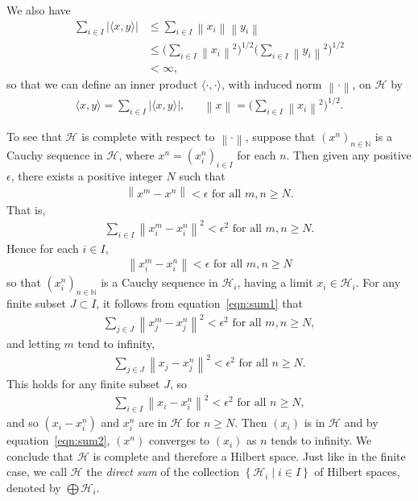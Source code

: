\documentclass[11pt,a4paper]{report}
\theoremstyle{plain}
\theoremstyle{definition}
\newcommand{\1}{\mathbbm{1}}
\newcommand{\N}{\mathbb{N}}
\renewcommand{\H}{\mathcal{H}}
\renewcommand{\oplus}{\textstyle\bigoplus}
\begin{document}
We also have
\begin{align*}
			\sum_{i\in I}{\left|\langle x,y\rangle\right|} 
	&\leq	\sum_{i\in I}{\left\|x_i\right\|	\left\|y_i\right\|}							\\
	&\leq 	\Big(\sum_{i\in I}{\left\|x_i\right\|^2}\Big)^{1/2}
							\Big(\sum_{i\in I}{\left\|y_i\right\|^2}\Big)^{1/2}				\\
	&< \infty,
\end{align*}
so that we can define an inner product $\langle\cdot,\cdot\rangle$, with induced 
norm $\left\|\cdot\right\|$, on $\H$ by
\begin{align*}
	\langle x,y\rangle = \sum_{i\in I}{\left|\langle x,y\rangle\right|}, 
			&& \left\|x\right\| = \Big(\sum_{i\in I}{\left\|x_i\right\|^2}\Big)^{1/2}.
\end{align*}

To see that $\H$ is complete with respect to $\left\|\cdot\right\|$, suppose 
that $(x^{n})_{n\in\N}$ is a Cauchy sequence in $\H$, where $x^{n} = 
(x^n_i)_{i\in I}$ for each $n$. Then given any positive $\epsilon$, there exists 
a positive integer $N$ such that
\begin{align*}
	\left\|x^m-x^n\right\| < \epsilon \mbox{ for all } m,n\geq N.
\end{align*}
That is,
\begin{align}\label{eqn:sum1}
	\sum_{i\in I}{\left\|x^m_i-x^n_i\right\|^2} < \epsilon^2 \mbox{ for all } m,n\geq N.
\end{align}
Hence for each $i\in I$,
\begin{align*}
	\left\|x^m_i-x^n_i\right\| < \epsilon \mbox{ for all } m,n\geq N
\end{align*}
so that $(x^n_i)_{n\in\N}$ is a Cauchy sequence in $\H_i$, having a limit $x_i\in\H_i$.
For any finite subset $J\subset I$, it follows from equation~\eqref{eqn:sum1} that 
\begin{align*}
	\sum_{j\in J}{\left\|x^m_j-x^n_j\right\|^2} < \epsilon^2  \mbox{ for all } m,n\geq N,
\end{align*}
and letting $m$ tend to infinity,
\begin{align}\label{eqn:sum2}
	\sum_{j\in J}{\left\|x_j-x^n_j\right\|^2} < \epsilon^2  \mbox{ for all } n\geq N.
\end{align}
This holds for any finite subset $J$, so
\begin{align*}
	\sum_{i\in I}{\left\|x_i-x^n_i\right\|^2} < \epsilon^2  \mbox{ for all } n\geq N,
\end{align*}
and so $(x_i-x^n_i)$ and $x^n_i$ are in $\H$ for $n\geq N$. Then $(x_i)$ is in 
$\H$ and by equation~\eqref{eqn:sum2}, $(x^n)$ converges to $(x_i)$ as $n$ tends to 
infinity. We conclude that $\H$ is complete and therefore a Hilbert space. Just 
like in the finite case, we call $\H$ the \emph{direct sum} of the collection 
$\left\{\H_i \mid i\in I\right\}$ of Hilbert spaces, denoted by $\oplus\H_i$.
\end{document}
